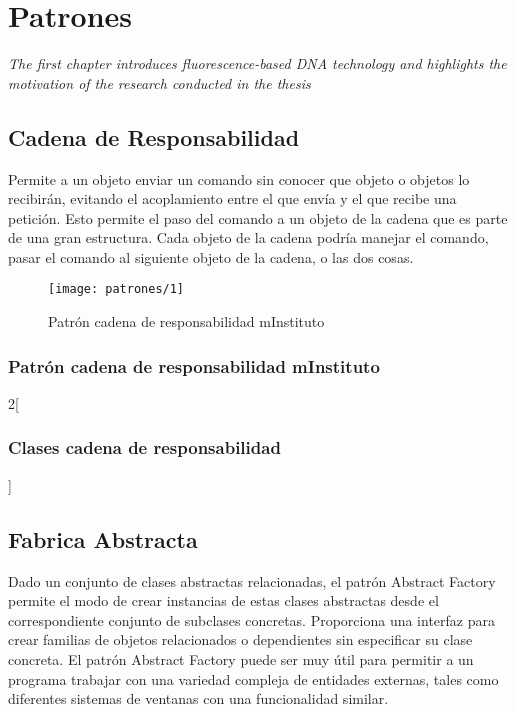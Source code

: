 \chapter{Patrones}
\label{apex:patrones}
\textit{The first chapter introduces fluorescence-based DNA technology and highlights the motivation of the research conducted in the thesis}
\vfill
\minitoc
\newpage

\section{Cadena de Responsabilidad}
Permite a un objeto enviar un comando sin conocer que objeto o objetos lo recibirán, evitando el acoplamiento entre el que envía y el que recibe una petición. Esto permite el paso del comando a un objeto de la cadena que es parte de una gran estructura. Cada objeto de la cadena podría manejar el comando, pasar el comando al siguiente objeto de la cadena, o las dos cosas.

  \begin{figure}[H]
 	\centering
  	\texttt{[image: patrones/1]}
  	\captionsetup{width=.95\textwidth}
  	\caption{Patrón cadena de responsabilidad mInstituto}
  	\label{patron1}
  \end{figure}

  \subsection{Patrón cadena de responsabilidad mInstituto}
  \blindtext
  
  \begin{multicols}{2}[\subsection{Clases cadena de responsabilidad}]
    
    
    
  \end{multicols}
  
\section{Fabrica Abstracta}
Dado un conjunto de clases abstractas relacionadas, el patrón Abstract Factory permite el modo de crear instancias de estas clases abstractas desde el correspondiente conjunto de subclases concretas. Proporciona una interfaz para crear familias de objetos relacionados o dependientes sin especificar su clase concreta. El patrón Abstract Factory puede ser muy útil para permitir a un programa trabajar con una variedad compleja de entidades externas, tales como diferentes sistemas de ventanas con una funcionalidad similar.

